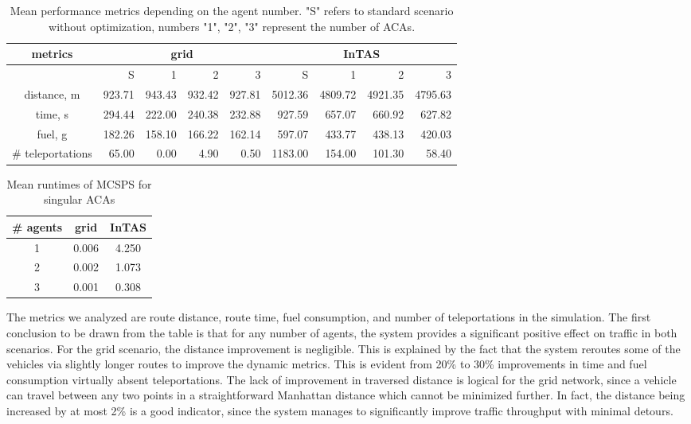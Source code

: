 \documentclass[sigconf]{aamas}
\begin{document}
\begin{table}
    \centering
    \begin{tabular}{crrrrrrrr}\toprule
         metrics& \multicolumn{4}{c}{grid} & \multicolumn{4}{c}{InTAS}\\\midrule
         & S & 1 & 2 & 3 & S & 1 & 2 & 3 \\
         distance, m& 923.71 &943.43 & 932.42&927.81 & 5012.36 & 4809.72 & 4921.35 & 4795.63\\
         time, s& 294.44 & 222.00 & 240.38& 232.88 & 927.59 & 657.07 & 660.92 & 627.82\\
         fuel, g& 182.26 & 158.10& 166.22& 162.14& 597.07 & 433.77 & 438.13 & 420.03\\
         \# teleportations& 65.00 & 0.00& 4.90 & 0.50 & 1183.00 & 154.00& 101.30& 58.40\\\bottomrule
    \end{tabular}
    \caption{Mean performance metrics depending on the agent number. "S" refers to standard scenario without optimization, numbers "1", "2", "3" represent the number of ACAs.}
    \label{tab:agents}
\end{table}

\begin{table}
    \centering
    \begin{tabular}{ccc} \toprule
        \# agents & grid & InTAS\\\midrule
        1 & 0.006 & 4.250\\
        2 & 0.002 & 1.073\\
        3 & 0.001 & 0.308\\
        \bottomrule
    \end{tabular}
    \caption{Mean runtimes of MCSPS for singular ACAs}
    \label{tab:sps}
\end{table}

The metrics we analyzed are route distance, route time, fuel consumption, and number of teleportations in the simulation. The first conclusion to be drawn from the table is that for any number of agents, the system provides a significant positive effect on traffic in both scenarios. For the grid scenario, the distance improvement is negligible. This is explained by the fact that the system reroutes some of the vehicles via slightly longer routes to improve the dynamic metrics. This is evident from 20\% to 30\% improvements in time and fuel consumption virtually absent teleportations. The lack of improvement in traversed distance is logical for the grid network, since a vehicle can travel between any two points in a straightforward Manhattan distance which cannot be minimized further. In fact, the distance being increased by at most 2\% is a good indicator, since the system manages to significantly improve traffic throughput with minimal detours.
\end{document}
